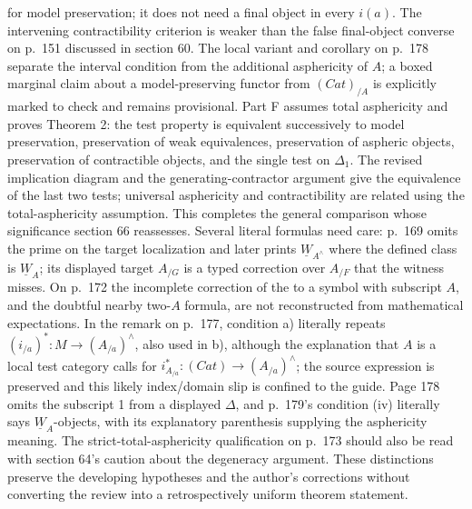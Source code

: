\documentclass[10pt,oneside]{book}
\begin{document}
for model preservation; it does not need a final object in every $i(a)$. The intervening contractibility criterion is weaker than the false final-object converse on p.~151 discussed in section 60. The local variant and corollary on p.~178 separate the interval condition from the additional asphericity of $A$; a boxed marginal claim about a model-preserving functor from $(Cat)_{/A}$ is explicitly marked to check and remains provisional. Part F assumes total asphericity and proves Theorem 2: the test property is equivalent successively to model preservation, preservation of weak equivalences, preservation of aspheric objects, preservation of contractible objects, and the single test on $\Delta_1$. The revised implication diagram and the generating-contractor argument give the equivalence of the last two tests; universal asphericity and contractibility are related using the total-asphericity assumption. This completes the general comparison whose significance section 66 reassesses. Several literal formulas need care: p.~169 omits the prime on the target localization and later prints $\underline W_{A^\wedge}$ where the defined class is $\underline W_A$; its displayed target $A_{/G}$ is a typed correction over $A_{/F}$ that the witness misses. On p.~172 the incomplete correction of the to a symbol with subscript $A$, and the doubtful nearby two-$A$ formula, are not reconstructed from mathematical expectations. In the remark on p.~177, condition a) literally repeats $(i_{/a})^*:M\to(A_{/a})^\wedge$, also used in b), although the explanation that $A$ is a local test category calls for $i_{A_{/a}}^*:(Cat)\to(A_{/a})^\wedge$; the source expression is preserved and this likely index/domain slip is confined to the guide. Page 178 omits the subscript 1 from a displayed $\Delta$, and p.~179's condition (iv) literally says $\underline W_A$-objects, with its explanatory parenthesis supplying the asphericity meaning. The strict-total-asphericity qualification on p.~173 should also be read with section 64's caution about the degeneracy argument. These distinctions preserve the developing hypotheses and the author's corrections without converting the review into a retrospectively uniform theorem statement.
\end{document}
